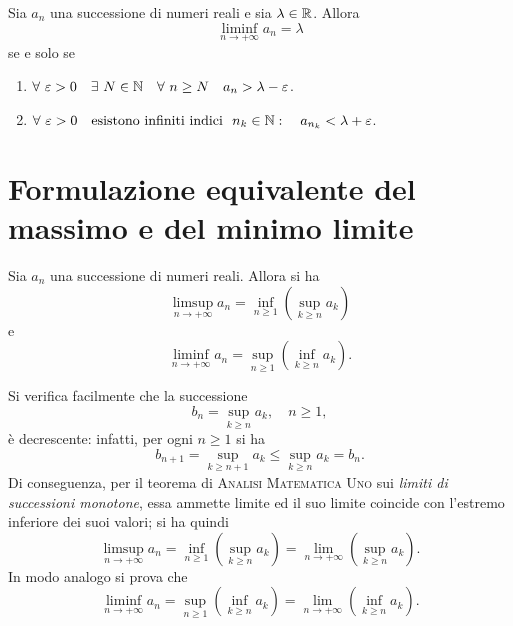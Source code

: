 \begin{propositionqed}
Sia $a_n$ una successione di numeri reali e sia $\lambda \in \mathbb{R}$. Allora 
\begin{equation*}
	\liminf_{n\to +\infty} a_n =\lambda
\end{equation*}
se e solo se
\begin{enumerate}
	\item $\forall \ \varepsilon>0 \quad \exists \ N\in \mathbb{N}\quad \forall \ n\geq N \quad a_n>\lambda -\varepsilon$.
	\item $\forall \ \varepsilon>0 \quad \mbox{esistono infiniti indici }\ n_k\in \mathbb{N}:\quad a_{n_k}<\lambda +\varepsilon$.\qedhere
\end{enumerate}
\end{propositionqed}
\section{Formulazione equivalente del massimo e del minimo limite}
\begin{proposition}
Sia $a_n$ una successione di numeri reali. Allora si ha
\begin{equation}
	\limsup_{n\to +\infty} a_n = \inf_{n\geq 1} \left( \sup_{k\geq n} a_k\right)
\end{equation}
e
\begin{equation}
	\liminf_{n\to +\infty} a_n = \sup_{n\geq 1} \left( \inf_{k\geq n} a_k\right).
\end{equation}
\end{proposition}
\begin{observe}
Si verifica facilmente che la successione
\begin{equation*}
	b_n=  \sup_{k\geq n} a_k,\quad n\geq 1,
\end{equation*}
è decrescente: infatti, per ogni $n\geq 1$ si ha
\begin{equation*}
	b_{n+1} = \sup_{k\geq n+1} a_k \leq \sup_{k\geq n} a_k =b_n.
\end{equation*}
Di conseguenza, per il teorema di \textsc{Analisi Matematica Uno} sui \textit{limiti di successioni monotone}, essa ammette limite ed il suo limite coincide con l'estremo inferiore dei suoi valori; si ha quindi
\begin{equation}
	\limsup_{n\to +\infty} a_n = \inf_{n\geq 1} \left( \sup_{k\geq n} a_k\right) = \lim_{n\to +\infty} \left( \sup_{k\geq n} a_k\right).
\end{equation}
In modo analogo si prova che 
\begin{equation}
	\liminf_{n\to +\infty} a_n = \sup_{n\geq 1} \left( \inf_{k\geq n} a_k\right) = \lim_{n\to +\infty} \left( \inf_{k\geq n} a_k\right).
\end{equation}
\end{observe}
